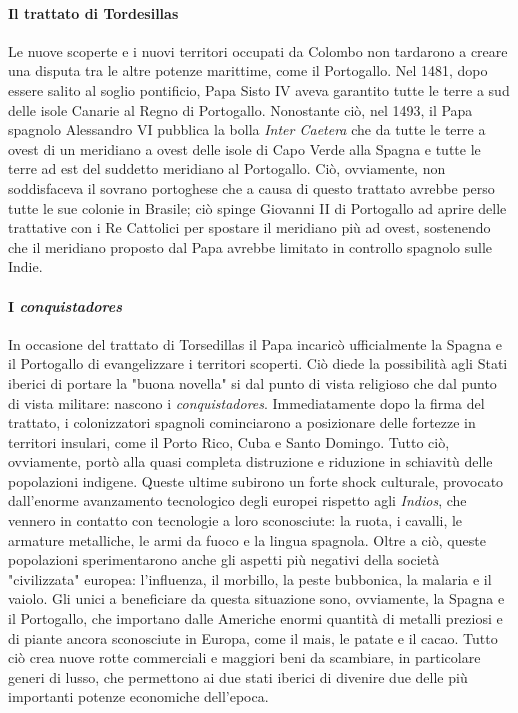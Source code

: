 \documentclass[11pt]{report}
\begin{document}
	\paragraph*{Il trattato di Tordesillas}
	
	Le nuove scoperte e i nuovi territori occupati da Colombo non tardarono a creare una disputa tra le altre potenze marittime, come il Portogallo. Nel 1481, dopo essere salito al soglio pontificio, Papa Sisto IV aveva garantito tutte le terre a sud delle isole Canarie al Regno di Portogallo. Nonostante ciò, nel 1493, il Papa spagnolo Alessandro VI pubblica la bolla \textit{Inter Caetera} che da tutte le terre a ovest di un meridiano a ovest delle isole di Capo Verde alla Spagna e tutte le terre ad est del suddetto meridiano al Portogallo. Ciò, ovviamente, non soddisfaceva il sovrano portoghese che a causa di questo trattato avrebbe perso tutte le sue colonie in Brasile; ciò spinge Giovanni II di Portogallo ad aprire delle trattative con i Re Cattolici per spostare il meridiano più ad ovest, sostenendo che il meridiano proposto dal Papa avrebbe limitato in controllo spagnolo sulle Indie.\cite{parry2010age} 
	
	\paragraph*{I \textit{conquistadores}}
	
	In occasione del trattato di Torsedillas il Papa incaricò ufficialmente la Spagna e il Portogallo di evangelizzare i territori scoperti. Ciò diede la possibilità agli Stati iberici di portare la "buona novella" si dal punto di vista religioso che dal punto di vista militare: nascono i \textit{conquistadores}. Immediatamente dopo la firma del trattato, i colonizzatori spagnoli cominciarono a posizionare delle fortezze in territori insulari, come il Porto Rico, Cuba e Santo Domingo. Tutto ciò, ovviamente, portò alla quasi completa distruzione e riduzione in schiavitù delle popolazioni indigene. Queste ultime subirono un forte  shock culturale, provocato dall'enorme avanzamento tecnologico degli europei rispetto agli \textit{Indios}, che vennero in contatto con tecnologie a loro sconosciute: la ruota, i cavalli, le armature metalliche, le armi da fuoco e la lingua spagnola. Oltre a ciò, queste popolazioni sperimentarono anche gli aspetti più negativi della società "civilizzata" europea: l'influenza, il morbillo, la peste bubbonica, la malaria e il vaiolo.\cite{crosby1967conquistador} Gli unici a beneficiare da questa situazione sono, ovviamente, la Spagna e il Portogallo, che importano dalle Americhe enormi quantità di metalli preziosi e di piante ancora sconosciute in Europa, come il mais, le patate e il cacao. Tutto ciò crea nuove rotte commerciali e maggiori beni da scambiare, in particolare generi di lusso, che permettono ai due stati iberici di divenire due delle più importanti potenze economiche dell'epoca.
	
\end{document}
